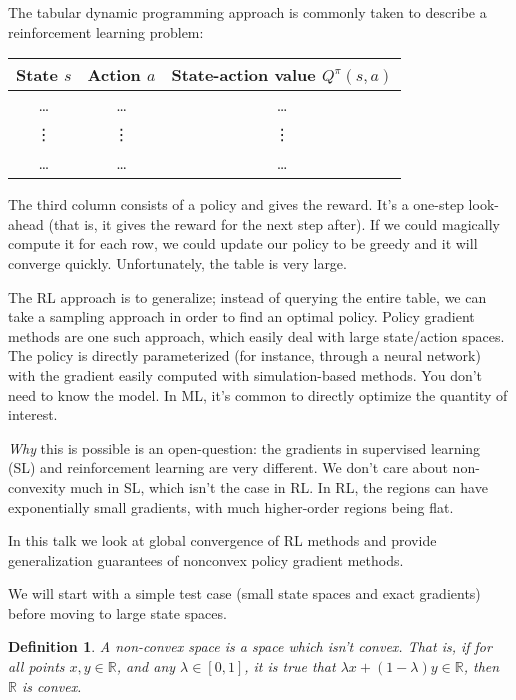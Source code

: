 \documentclass[12pt,reqno]{amsart}
\newtheorem{defn}{Definition}
\begin{document}
The tabular dynamic programming approach is commonly taken to describe a reinforcement learning problem:
\newline
\begin{tabular}{|c|c|c|}
\hline
State $s$ & Action $a$ & State-action value $Q^{\pi}(s,a)$ \\
\hline
\ldots & \ldots & \ldots \\
\hline
\vdots & \vdots & \vdots \\
\hline
\ldots & \ldots & \ldots \\
\hline
\end{tabular}
\newline
	The third column consists of a policy and gives the reward. It's a one-step look-ahead (that is, it gives the reward for the next step after). If we could magically compute it for each row, we could update our policy to be greedy and it will converge quickly. Unfortunately, the table is very large.

The RL approach is to generalize; instead of querying the entire table, we can take a sampling approach in order to find an optimal policy. Policy gradient methods are one such approach, which easily deal with large state/action spaces. The policy is directly parameterized (for instance, through a neural network) with the gradient easily computed with simulation-based methods. You don't need to know the model. In ML, it's common to directly optimize the quantity of interest. 

\textit{Why} this is possible is an open-question: the gradients in supervised learning (SL) and reinforcement learning are very different. We don't care about non-convexity much in SL, which isn't the case in RL. In RL, the regions can have exponentially small gradients, with much higher-order regions being flat.

In this talk we look at global convergence of RL methods and provide generalization guarantees of nonconvex policy gradient methods.

We will start with a simple test case (small state spaces and exact gradients) before moving to large state spaces.

\begin{shaded}
\begin{defn}
A non-convex space is a space which isn't convex. That is, if for all points $x,y \in \mathbb{R}$, and any $\lambda \in [0,1]$, it is true that $\lambda x + (1-\lambda)y \in \mathbb{R}$, then $\mathbb{R}$ is convex.
\end{defn}
\end{shaded}
\end{document}
